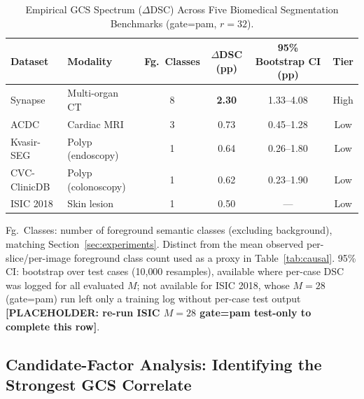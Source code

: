 \begin{table}[tb]
  \caption{Empirical GCS Spectrum ($\Delta$DSC) Across Five Biomedical Segmentation Benchmarks (gate=pam, $r{=}32$).}
  \label{tab:gcs_spectrum}
  \centering
  \setlength{\tabcolsep}{6pt}
  \begin{tabular}{llcccc}
    \toprule
    Dataset & Modality & Fg.\ Classes & $\Delta$DSC (pp) & 95\% Bootstrap CI (pp) & Tier \\
    \midrule
    Synapse      & Multi-organ CT      & 8 & \textbf{2.30} & 1.33--4.08 & High \\
    ACDC         & Cardiac MRI         & 3 & 0.73          & 0.45--1.28 & Low \\
    Kvasir-SEG   & Polyp (endoscopy)   & 1 & 0.64          & 0.26--1.80 & Low \\
    CVC-ClinicDB & Polyp (colonoscopy) & 1 & 0.62          & 0.23--1.90 & Low \\
    ISIC 2018    & Skin lesion         & 1 & 0.50          & ---        & Low \\
    \bottomrule
  \end{tabular}
  \par\vspace{5pt}
  \parbox{\textwidth}{\footnotesize Fg.\ Classes: number of foreground semantic classes (excluding background), matching Section~\ref{sec:experiments}. Distinct from the mean observed per-slice/per-image foreground class count used as a proxy in Table~\ref{tab:causal}. 95\% CI: bootstrap over test cases (10{,}000 resamples), available where per-case DSC was logged for all evaluated $M$; not available for ISIC 2018, whose $M{=}28$ (gate=pam) run left only a training log without per-case test output \textbf{[PLACEHOLDER: re-run ISIC $M{=}28$ gate=pam test-only to complete this row]}.}
\end{table}

\subsection{Candidate-Factor Analysis: Identifying the Strongest GCS Correlate}
\label{sec:causal_elimination}

